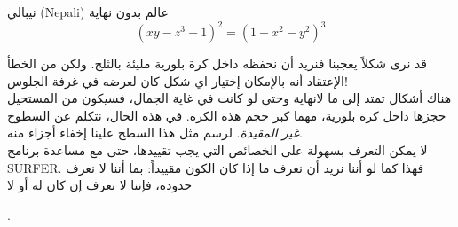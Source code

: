 \begin{surferPage}{نيبالي (Nepali)}
عالم بدون نهاية \\

\smallskip
\[(x y - z^3 -1)^2= (1 - x^2	- y^2)^3\]

\singlespacing
قد نرى شكلاً يعجبنا فنريد أن نحفظه داخل كرة بلورية مليئة بالثلج. ولكن من الخطأ الإعتقاد أنه بالإمكان إختيار اي شكل كان لعرضه في غرفة الجلوس!
\\
\singlespacing
هناك أشكال تمتد إلى ما لانهاية وحتى لو كانت في غاية الجمال، فسيكون من المستحيل حجزها داخل كرة بلورية، مهما كبر حجم هذه الكرة. في هذه الحال، نتكلم عن السطوح \textit{غير المقيدة}. لرسم مثل هذا السطح علينا إخفاء أجزاء منه.
\\
\singlespacing
لا يمكن التعرف بسهولة على الخصائص التي يجب تقييدها، حتى مع مساعدة برنامج SURFER. فهذا كما لو أننا نريد أن نعرف ما إذا كان الكون مقييداً: بما أننا لا نعرف حدوده، فإننا لا نعرف إن كان له أو لا
\end{surferPage}.